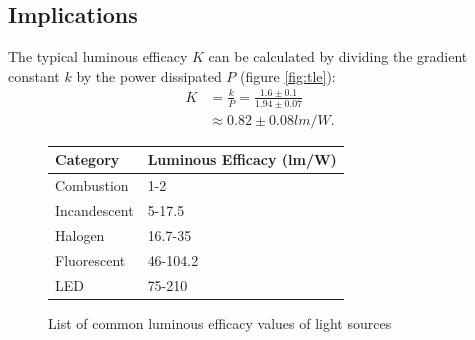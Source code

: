 \documentclass[a4paper,12pt]{article}
\begin{document}
\subsection{Implications}




The typical luminous efficacy $K$ can be calculated by dividing the gradient constant $k$ by the power dissipated $P$ (figure \ref{fig:tle}):
\begin{align*}
    K &= \frac{k}{P} = \frac{1.6 \pm 0.1}{1.94 \pm 0.07}\\
    &\approx 0.82 \pm 0.08 \si{lm\per W}.
\end{align*}

\begin{figure}
    \centering
    \begin{tabular}{l|l}
        Category     & Luminous Efficacy (lm/W) \\ \hline
        Combustion   & 1-2                      \\
        Incandescent & 5-17.5                   \\
        Halogen      & 16.7-35                  \\
        Fluorescent  & 46-104.2                 \\
        LED          & 75-210
    \end{tabular}
    \caption{List of common luminous efficacy values of light sources\protect\footnotemark}
    \label{tbl:leff}
\end{figure}
\end{document}

